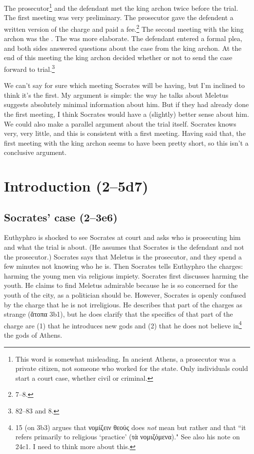 \documentclass[11pt]{article}
\begin{document}
The prosecutor\footnote{This word is somewhat misleading.  In ancient Athens, a prosecutor was a private citizen, not someone who worked for the state.  Only individuals could start a court case, whether civil or criminal.} and the defendant met the king archon twice before the trial.  The first meeting was very preliminary.  The prosecutor gave the defendent a written version of the charge and paid a fee.\footnote {\citet{brickhouse2004} 7--8.}  The second meeting with the king archon was the .  The  was more elaborate.  The defendant entered a formal plea, and both sides answered questions about the case from the king archon.  At the end of this meeting the king archon decided whether or not to send the case forward to trial.\footnote {\citet{burnet1924} 82--83 and \citet{brickhouse2004} 8.}

We can't say for sure which meeting Socrates will be having, but I'm inclined to think it's the first. My argument is simple: the way he talks about Meletus suggests absolutely minimal information about him.  But if they had already done the first meeting, I think Socrates would have a (slightly) better sense about him.  We could also make a parallel argument about the trial itself.  Socrates knows very, very little, and this is consistent with a first meeting.  Having said that, the first meeting with the king archon seems to have been pretty short, so this isn't a conclusive argument.

\section{Introduction (2--5d7)}

\subsection{Socrates' case (2--3e6)}

Euthyphro is shocked to see Socrates at court and asks who is prosecuting him and what the trial is about.  (He assumes that Socrates is the defendant and not the prosecutor.)  Socrates says that Meletus is the prosecutor, and they spend a few minutes not knowing who he is.  Then Socrates tells Euthyphro the charges: harming the young men via religious impiety.  Socrates first discusses harming the youth.  He claims to find Meletus admirable because he is so concerned for the youth of the city, as a politician should be.  However, Socrates is openly confused by the charge that he is not irreligious.  He describes that part of the charges as strange (ἄτοπα 3b1), but he does clarify that the specifics of that part of the charge are (1) that he introduces new gods and (2) that he does not believe in\footnote{\citet{burnet1924} 15 (on 3b3) argues that νομίζειν θεούς does \emph{not} mean  but rather  and that ``it refers primarily to religious `practice' (τὰ νομιζόμενα)."  See also his note on  24c1.  I need to think more about this.} the gods of Athens.
\end{document}

